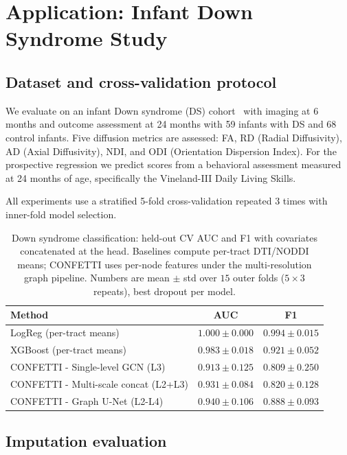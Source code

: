 \documentclass[runningheads]{llncs}
\begin{document}
\section{Application: Infant Down Syndrome Study}

\subsection{Dataset and cross-validation protocol}

We evaluate on an infant Down syndrome (DS) cohort~\cite{ref_cohort} with imaging at
6 months and outcome assessment at 24 months
with 59 infants with DS and 68 control infants. Five diffusion metrics are assessed: FA, RD (Radial Diffusivity), AD (Axial Diffusivity), NDI, and ODI (Orientation Dispersion Index). For the
prospective regression we predict scores from a behavioral assessment measured at 24 months of age, specifically the Vineland-III Daily Living Skills.

All experiments use a stratified 5-fold cross-validation
repeated 3 times with inner-fold model selection.


\begin{table}[bt]
\centering
\caption{Down syndrome classification: held-out CV AUC and F1 with
covariates concatenated at the head. Baselines compute per-tract DTI/NODDI
means; CONFETTI uses per-node features under the multi-resolution graph
pipeline. Numbers are mean $\pm$ std over $15$ outer folds ($5\times 3$
repeats), best dropout per model.}
\label{tab:cls}
\begin{tabular}{lcc}
\toprule
Method & AUC & F1 \\
\midrule
LogReg (per-tract means) & $1.000\pm 0.000$ & $0.994\pm 0.015$ \\
XGBoost (per-tract means) & $0.983\pm 0.018$ & $0.921\pm 0.052$ \\
\midrule
CONFETTI - Single-level GCN (L3) & $0.913\pm 0.125$ & $0.809\pm 0.250$ \\
CONFETTI - Multi-scale concat (L2+L3) & $0.931\pm 0.084$ & $0.820\pm 0.128$ \\
CONFETTI - Graph U-Net (L2-L4) & $\mathbf{0.940\pm 0.106}$ & $\mathbf{0.888\pm 0.093}$ \\
\bottomrule
\end{tabular}
\end{table}

\subsection{Imputation evaluation}
\end{document}

